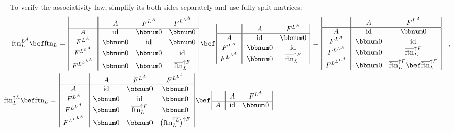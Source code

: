 To verify the associativity law, simplify its both sides separately
and use fully split matrices:
\begin{align*}
 & \text{ftn}_{L}^{L^{A}}\bef\text{ftn}_{L}=\,\begin{array}{|c||ccc|}
 & A & F^{L^{A}} & F^{L^{L^{A}}}\\
\hline A & \text{id} & \bbnum 0 & \bbnum 0\\
F^{L^{A}} & \bbnum 0 & \text{id} & \bbnum 0\\
F^{L^{L^{A}}} & \bbnum 0 & \bbnum 0 & \text{id}\\
F^{L^{L^{L^{A}}}} & \bbnum 0 & \bbnum 0 & \overline{\text{ftn}}_{L}^{\uparrow F}
\end{array}\,\bef\,\begin{array}{|c||cc|}
 & A & F^{L^{A}}\\
\hline A & \text{id} & \bbnum 0\\
F^{L^{A}} & \bbnum 0 & \text{id}\\
F^{L^{L^{A}}} & \bbnum 0 & \overline{\text{ftn}}_{L}^{\uparrow F}
\end{array}\,=\,\begin{array}{|c||cc|}
 & A & F^{L^{A}}\\
\hline A & \text{id} & \bbnum 0\\
F^{L^{A}} & \bbnum 0 & \text{id}\\
F^{L^{L^{A}}} & \bbnum 0 & \overline{\text{ftn}}_{L}^{\uparrow F}\\
F^{L^{L^{L^{A}}}} & \bbnum 0 & \overline{\text{ftn}}_{L}^{\uparrow F}\bef\overline{\text{ftn}}_{L}^{\uparrow F}
\end{array}\quad,\\
 & \negthickspace\negthickspace\negthickspace\negthickspace\text{ftn}_{L}^{\uparrow L}\bef\text{ftn}_{L}=\,\begin{array}{|c||ccc|}
 & A & F^{L^{A}} & F^{L^{L^{A}}}\\
\hline A & \text{id} & \bbnum 0 & \bbnum 0\\
F^{L^{A}} & \bbnum 0 & \text{id} & \bbnum 0\\
F^{L^{L^{A}}} & \bbnum 0 & \overline{\text{ftn}}_{L}^{\uparrow F} & \bbnum 0\\
F^{L^{L^{L^{A}}}} & \bbnum 0 & \bbnum 0 & \big(\text{ftn}_{L}^{\overline{\uparrow L}}\big)^{\uparrow F}
\end{array}\,\bef\,\begin{array}{|c||cc|}
 & A & F^{L^{A}}\\
\hline A & \text{id} & \bbnum 0\\

\end{array}
\end{align*}
